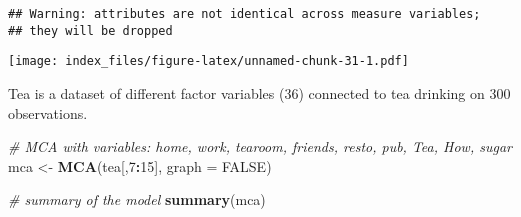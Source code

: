 \documentclass[]{article}
\newenvironment{Shaded}{\begin{snugshade}}{\end{snugshade}}
\newcommand{\KeywordTok}[1]{\textcolor[rgb]{0.13,0.29,0.53}{\textbf{#1}}}
\newcommand{\DataTypeTok}[1]{\textcolor[rgb]{0.13,0.29,0.53}{#1}}
\newcommand{\DecValTok}[1]{\textcolor[rgb]{0.00,0.00,0.81}{#1}}
\newcommand{\StringTok}[1]{\textcolor[rgb]{0.31,0.60,0.02}{#1}}
\newcommand{\CommentTok}[1]{\textcolor[rgb]{0.56,0.35,0.01}{\textit{#1}}}
\newcommand{\OtherTok}[1]{\textcolor[rgb]{0.56,0.35,0.01}{#1}}
\newcommand{\OperatorTok}[1]{\textcolor[rgb]{0.81,0.36,0.00}{\textbf{#1}}}
\newcommand{\NormalTok}[1]{#1}
\begin{document}
\begin{Shaded}
\end{Shaded}

\begin{verbatim}
## Warning: attributes are not identical across measure variables;
## they will be dropped
\end{verbatim}

\texttt{[image: index\_files/figure-latex/unnamed-chunk-31-1.pdf]}

Tea is a dataset of different factor variables (36) connected to tea
drinking on 300 observations.

\begin{Shaded}
\begin{Highlighting}[]
\CommentTok{# MCA with variables: home, work, tearoom, friends, resto, pub, Tea, How, sugar}
\NormalTok{mca <-}\StringTok{ }\KeywordTok{MCA}\NormalTok{(tea[,}\DecValTok{7}\OperatorTok{:}\DecValTok{15}\NormalTok{], }\DataTypeTok{graph =} \OtherTok{FALSE}\NormalTok{)}

\CommentTok{# summary of the model}
\KeywordTok{summary}\NormalTok{(mca)}
\end{Highlighting}
\end{Shaded}
\end{document}
